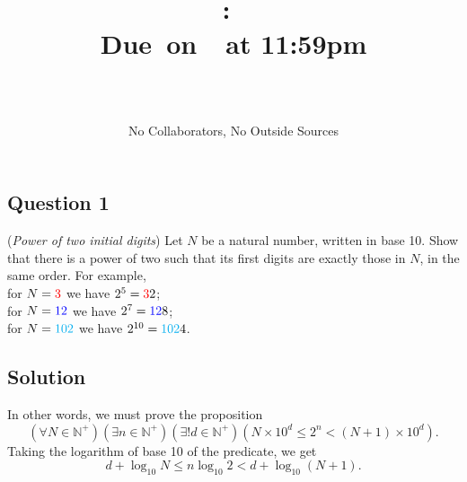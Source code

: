 \documentclass{article}
\title{
    \vspace{2in}
    \textbf{\hmwkClass:\ \hmwkTitle}\\
    \normalsize\vspace{0.1in}\small{Due\ on\ \hmwkDueDate\ at 11:59pm}\\
    \vspace{0.1in}\large{\textit{\hmwkClassInstructor}}
    \vspace{3in}
    \author{\textbf{\hmwkAuthorName} \\ \\ \small No Collaborators, No Outside Sources}
    \date{}
}
\begin{document}
\maketitle
\pagebreak

\subsection*{Question 1}
    (\textit{Power of two initial digits}) Let $N$ be a natural number, written in base 10. Show that there is a power of two such that its first digits are exactly those in $N$, in the same order. For example, \\
    for $N = \textcolor{red}{3}$ we have $2^{5} = \textcolor{red}{3}2$; \\
    for $N = \textcolor{blue}{12}$ we have $2^{7} = \textcolor{blue}{12}8$; \\
    for $N = \textcolor{cyan}{102}$ we have $2^{10} = \textcolor{cyan}{102}4$.

\subsection*{Solution}
    In other words, we must prove the proposition $$(\forall N \in \mathbb{N}^{+})(\exists n \in \mathbb{N}^{+})(\exists! d \in \mathbb{N}^{+})(N \times 10^{d} \le 2^{n} < (N + 1) \times 10^{d}).$$ Taking the logarithm of base 10 of the predicate, we get $$d + \log_{10}N \le n \log_{10}2 < d + \log_{10}(N + 1).$$
    
\end{document}
